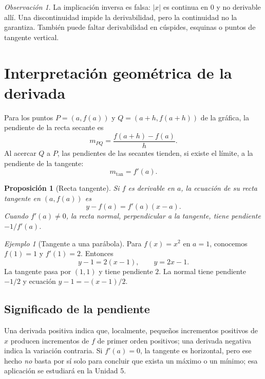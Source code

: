 \documentclass[12pt]{article}
\newtheorem{proposicion}[definicion]{Proposición}
\theoremstyle{remark}
\newtheorem{observacion}[definicion]{Observación}
\newtheorem{ejemplo}[definicion]{Ejemplo}
\begin{document}
\begin{observacion}
La implicación inversa es falsa: $|x|$ es continua en $0$ y no derivable allí. Una discontinuidad impide la derivabilidad, pero la continuidad no la garantiza. También puede faltar derivabilidad en cúspides, esquinas o puntos de tangente vertical.
\end{observacion}

\section{Interpretación geométrica de la derivada}
Para los puntos $P=(a,f(a))$ y $Q=(a+h,f(a+h))$ de la gráfica, la pendiente de la recta secante es
\[
m_{PQ}=\frac{f(a+h)-f(a)}h.
\]
Al acercar $Q$ a $P$, las pendientes de las secantes tienden, si existe el límite, a la pendiente de la tangente:
\[
\boxed{m_{\mathrm{tan}}=f'(a).}
\]

\begin{proposicion}[Recta tangente]
Si $f$ es derivable en $a$, la ecuación de su recta tangente en $(a,f(a))$ es
\[
\boxed{y-f(a)=f'(a)(x-a).}
\]
Cuando $f'(a)\ne0$, la recta normal, perpendicular a la tangente, tiene pendiente $-1/f'(a)$.
\end{proposicion}

\begin{ejemplo}[Tangente a una parábola]
Para $f(x)=x^2$ en $a=1$, conocemos $f(1)=1$ y $f'(1)=2$. Entonces
\[
y-1=2(x-1),\qquad\boxed{y=2x-1}.
\]
La tangente pasa por $(1,1)$ y tiene pendiente $2$. La normal tiene pendiente $-1/2$ y ecuación $y-1=-(x-1)/2$.
\end{ejemplo}

\begin{center}
\end{center}

\subsection*{Significado de la pendiente}
Una derivada positiva indica que, localmente, pequeños incrementos positivos de $x$ producen incrementos de $f$ de primer orden positivos; una derivada negativa indica la variación contraria. Si $f'(a)=0$, la tangente es horizontal, pero ese hecho \emph{no} basta por sí solo para concluir que exista un máximo o un mínimo; esa aplicación se estudiará en la Unidad 5.
\end{document}
